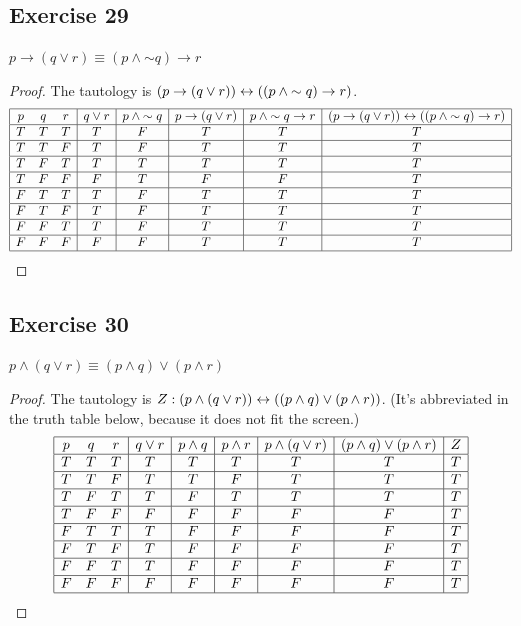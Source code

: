 \documentclass[14pt]{extarticle}
\begin{document}
\subsection{Exercise 29} $p \to (q \vee r) \equiv (p \wedge {\sim q}) \to r$
\begin{proof} The tautology is $(p \to (q \vee r)) \leftrightarrow ((p \wedge {\sim q}) \to
r)$. $$ \begin{array}{|ccc|c|c|c|c|c|c|} \hline p & q & r & q \vee r & p \wedge
{\sim q} & p \to (q \vee r) & p \wedge {\sim q} \to r & (p \to (q \vee r)) \leftrightarrow
((p \wedge {\sim q}) \to r) \\ \hline T & T & T & T & F & T & T & T \\ \hline T
& T & F & T & F & T & T & T \\ \hline T & F & T & T & T & T & T & T \\ \hline T
& F & F & F & T & F & F & T \\ \hline F & T & T & T & F & T & T & T \\ \hline F
& T & F & T & F & T & T & T \\ \hline F & F & T & T & F & T & T & T \\ \hline F
& F & F & F & F & T & T & T \\ \hline \end{array} $$ \end{proof}

\subsection{Exercise 30} $p \wedge (q \vee r) \equiv (p \wedge q) \vee (p \wedge
r)$

\begin{proof} The tautology is $Z: (p \wedge (q \vee r)) \leftrightarrow ((p \wedge q) \vee
(p \wedge r))$. (It's abbreviated in the truth table below, because it does not
fit the screen.) $$ \begin{array}{|ccc|c|c|c|c|c|c|} \hline p & q & r & q \vee r
& p \wedge q & p \wedge r & p \wedge (q \vee r) & (p \wedge q) \vee (p \wedge r)
& Z \\ \hline T & T & T & T & T & T & T & T & T \\ \hline T & T & F & T & T & F
& T & T & T \\ \hline T & F & T & T & F & T & T & T & T \\ \hline T & F & F & F
& F & F & F & F & T \\ \hline F & T & T & T & F & F & F & F & T \\ \hline F & T
& F & T & F & F & F & F & T \\ \hline F & F & T & T & F & F & F & F & T \\
\hline F & F & F & F & F & F & F & F & T \\ \hline \end{array} $$ \end{proof}
\end{document}
